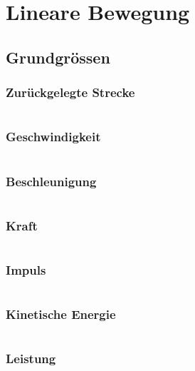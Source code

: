 



\chapter{Lineare Bewegung}

\section{Grundgrössen}

\subsection{Zurückgelegte Strecke}
\[  \]

\subsection{Geschwindigkeit}
\[  \]

\subsection{Beschleunigung}
\[  \]

\subsection{Kraft}
\[  \]

\subsection{Impuls}
\[  \]

\subsection{Kinetische Energie}
\[  \]

\subsection{Leistung}
\[  \]

